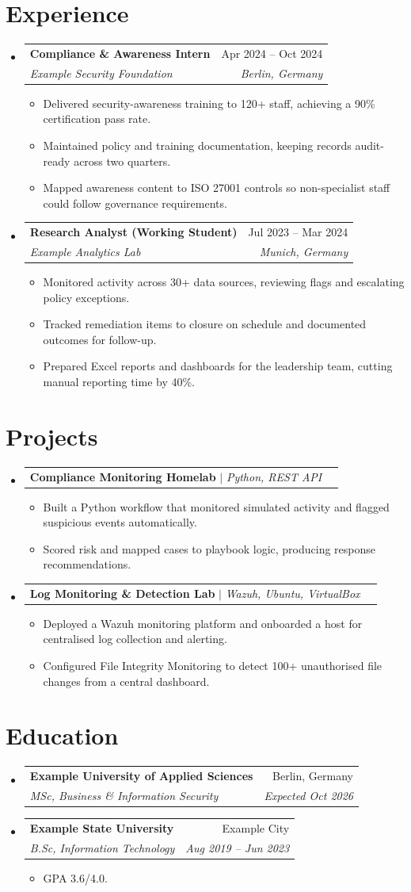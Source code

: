 \documentclass[letterpaper,11pt]{article}
\makeatletter
\newcommand{\resumeItem}[1]{
  \item\small{
    {#1 \vspace{-2pt}}
  }
}
\newcommand{\resumeSubheading}[4]{
  \vspace{-2pt}\item
    \begin{tabular*}{0.97\textwidth}[t]{l@{\extracolsep{\fill}}r}
      \textbf{#1} & #2 \\
      \textit{\small#3} & \textit{\small #4} \\
    \end{tabular*}\vspace{-7pt}
}
\newcommand{\resumeProjectHeading}[2]{
    \item
    \begin{tabular*}{0.97\textwidth}{l@{\extracolsep{\fill}}r}
      \small#1 & #2 \\
    \end{tabular*}\vspace{-7pt}
}
\newcommand{\resumeSubHeadingListStart}{\begin{itemize}[leftmargin=0.15in, label={}]}
\newcommand{\resumeSubHeadingListEnd}{\end{itemize}}
\newcommand{\resumeItemListStart}{\begin{itemize}}
\newcommand{\resumeItemListEnd}{\end{itemize}\vspace{-5pt}}
\makeatother
\begin{document}
\section{Experience}
\resumeSubHeadingListStart
    \resumeSubheading
      {Compliance \& Awareness Intern}{Apr 2024 -- Oct 2024}
      {Example Security Foundation}{Berlin, Germany}
      \resumeItemListStart
        \resumeItem{Delivered security-awareness training to 120+ staff, achieving a 90\% certification pass rate.}
        \resumeItem{Maintained policy and training documentation, keeping records audit-ready across two quarters.}
        \resumeItem{Mapped awareness content to ISO 27001 controls so non-specialist staff could follow governance requirements.}
      \resumeItemListEnd
    \resumeSubheading
      {Research Analyst (Working Student)}{Jul 2023 -- Mar 2024}
      {Example Analytics Lab}{Munich, Germany}
      \resumeItemListStart
        \resumeItem{Monitored activity across 30+ data sources, reviewing flags and escalating policy exceptions.}
        \resumeItem{Tracked remediation items to closure on schedule and documented outcomes for follow-up.}
        \resumeItem{Prepared Excel reports and dashboards for the leadership team, cutting manual reporting time by 40\%.}
      \resumeItemListEnd
\resumeSubHeadingListEnd

\section{Projects}
\resumeSubHeadingListStart
    \resumeProjectHeading
      {\textbf{Compliance Monitoring Homelab} $|$ \emph{Python, REST API}}{}
      \resumeItemListStart
        \resumeItem{Built a Python workflow that monitored simulated activity and flagged suspicious events automatically.}
        \resumeItem{Scored risk and mapped cases to playbook logic, producing response recommendations.}
      \resumeItemListEnd
    \resumeProjectHeading
      {\textbf{Log Monitoring \& Detection Lab} $|$ \emph{Wazuh, Ubuntu, VirtualBox}}{}
      \resumeItemListStart
        \resumeItem{Deployed a Wazuh monitoring platform and onboarded a host for centralised log collection and alerting.}
        \resumeItem{Configured File Integrity Monitoring to detect 100+ unauthorised file changes from a central dashboard.}
      \resumeItemListEnd
\resumeSubHeadingListEnd

\section{Education}
\resumeSubHeadingListStart
    \resumeSubheading
      {Example University of Applied Sciences}{Berlin, Germany}
      {MSc, Business \& Information Security}{Expected Oct 2026}
    \resumeSubheading
      {Example State University}{Example City}
      {B.Sc, Information Technology}{Aug 2019 -- Jun 2023}
      \resumeItemListStart
        \resumeItem{GPA 3.6/4.0.}
      \resumeItemListEnd
\resumeSubHeadingListEnd
\end{document}
